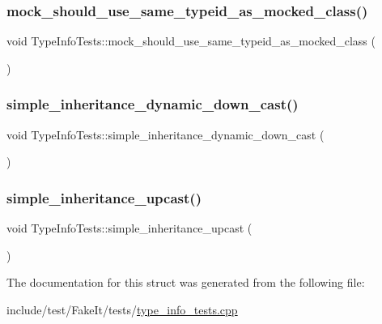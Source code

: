 \subsubsection{\texorpdfstring{mock\_should\_use\_same\_typeid\_as\_mocked\_class()}{mock\_should\_use\_same\_typeid\_as\_mocked\_class()}}
{\footnotesize\ttfamily void Type\+Info\+Tests\+::mock\+\_\+should\+\_\+use\+\_\+same\+\_\+typeid\+\_\+as\+\_\+mocked\+\_\+class (\begin{DoxyParamCaption}{ }\end{DoxyParamCaption})\hspace{0.3cm}{\ttfamily [inline]}}

\mbox{\label{structTypeInfoTests_a7e0450f4df5ceb49ced532ace7e565aa}} 
\subsubsection{\texorpdfstring{simple\_inheritance\_dynamic\_down\_cast()}{simple\_inheritance\_dynamic\_down\_cast()}}
{\footnotesize\ttfamily void Type\+Info\+Tests\+::simple\+\_\+inheritance\+\_\+dynamic\+\_\+down\+\_\+cast (\begin{DoxyParamCaption}{ }\end{DoxyParamCaption})\hspace{0.3cm}{\ttfamily [inline]}}

\mbox{\label{structTypeInfoTests_a052d271864fb921c8d0e6908207e1db6}} 
\subsubsection{\texorpdfstring{simple\_inheritance\_upcast()}{simple\_inheritance\_upcast()}}
{\footnotesize\ttfamily void Type\+Info\+Tests\+::simple\+\_\+inheritance\+\_\+upcast (\begin{DoxyParamCaption}{ }\end{DoxyParamCaption})\hspace{0.3cm}{\ttfamily [inline]}}



The documentation for this struct was generated from the following file\+:\begin{DoxyCompactItemize}
\item 
include/test/\+Fake\+It/tests/\mbox{\hyperlink{type__info__tests_8cpp}{type\+\_\+info\+\_\+tests.\+cpp}}\end{DoxyCompactItemize}
